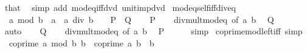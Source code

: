 \begin{isabellebody}
\endisadelimproof
%
\isatagproof
{}\isamarkupfalse%
\ that\ \isamarkupfalse%
\ {\isacharparenleft}{\kern0pt}simp\ add{\isacharcolon}{\kern0pt}\ mod{\isacharunderscore}{\kern0pt}eq{\isacharunderscore}{\kern0pt}{}{\isacharunderscore}{\kern0pt}iff{\isacharunderscore}{\kern0pt}dvd\ unit{\isacharunderscore}{\kern0pt}imp{\isacharunderscore}{\kern0pt}dvd{\isacharparenright}{\kern0pt}%
\endisatagproof
{\isafoldproof}%
%
\isadelimproof
\isanewline
%
\endisadelimproof
\isanewline
{}\isamarkupfalse%
\ mod{\isacharunderscore}{\kern0pt}eq{\isacharunderscore}{\kern0pt}self{\isacharunderscore}{\kern0pt}iff{\isacharunderscore}{\kern0pt}div{\isacharunderscore}{\kern0pt}eq{\isacharunderscore}{\kern0pt}{}{\isacharcolon}{\kern0pt}\isanewline
\ \ {\isachardoublequoteopen}a\ mod\ b\ {\isacharequal}{\kern0pt}\ a\ {\isasymlongleftrightarrow}\ a\ div\ b\ {\isacharequal}{\kern0pt}\ {}{\isachardoublequoteclose}\ {\isacharparenleft}{\kern0pt}\ {\isachardoublequoteopen}{\isacharquery}{\kern0pt}P\ {\isasymlongleftrightarrow}\ {\isacharquery}{\kern0pt}Q{\isachardoublequoteclose}{\isacharparenright}{\kern0pt}\isanewline
%
\isadelimproof
%
\endisadelimproof
%
\isatagproof
{}\isamarkupfalse%
\isanewline
\ \ \isamarkupfalse%
\ {\isacharquery}{\kern0pt}P\isanewline
\ \ \isamarkupfalse%
\ div{\isacharunderscore}{\kern0pt}mult{\isacharunderscore}{\kern0pt}mod{\isacharunderscore}{\kern0pt}eq\ {\isacharbrackleft}{\kern0pt}of\ a\ b{\isacharbrackright}{\kern0pt}\ \isamarkupfalse%
\ {\isacharquery}{\kern0pt}Q\isanewline
\ \ \ \ \isamarkupfalse%
\ auto\isanewline
{}\isamarkupfalse%
\isanewline
\ \ \isamarkupfalse%
\ {\isacharquery}{\kern0pt}Q\isanewline
\ \ \isamarkupfalse%
\ div{\isacharunderscore}{\kern0pt}mult{\isacharunderscore}{\kern0pt}mod{\isacharunderscore}{\kern0pt}eq\ {\isacharbrackleft}{\kern0pt}of\ a\ b{\isacharbrackright}{\kern0pt}\ \isamarkupfalse%
\ {\isacharquery}{\kern0pt}P\isanewline
\ \ \ \ \isamarkupfalse%
\ simp\isanewline
{}\isamarkupfalse%
%
\endisatagproof
{\isafoldproof}%
%
\isadelimproof
\isanewline
%
\endisadelimproof
\isanewline
{}\isamarkupfalse%
\ coprime{\isacharunderscore}{\kern0pt}mod{\isacharunderscore}{\kern0pt}left{\isacharunderscore}{\kern0pt}iff\ {\isacharbrackleft}{\kern0pt}simp{\isacharbrackright}{\kern0pt}{\isacharcolon}{\kern0pt}\isanewline
\ \ {\isachardoublequoteopen}coprime\ {\isacharparenleft}{\kern0pt}a\ mod\ b{\isacharparenright}{\kern0pt}\ b\ {\isasymlongleftrightarrow}\ coprime\ a\ b{\isachardoublequoteclose}\ \ {\isachardoublequoteopen}b\ {\isasymnoteq}\ {}{\isachardoublequoteclose}\isanewline

\end{isabellebody}
